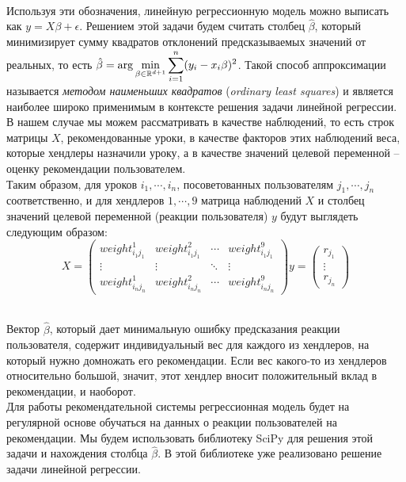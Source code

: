 \documentclass[14pt]{matmex-diploma}
\begin{document}
\\\indent Используя эти обозначения, линейную регрессионную модель можно выписать как $y = X \beta + \epsilon$. Решением этой задачи будем считать столбец $\hat\beta$, который минимизирует сумму квадратов отклонений предсказываемых значений от реальных, то есть $\displaystyle \hat\beta = {\rm arg}\min_{\beta\in\mathbb{R}^{d+1}} \sum_{i=1}^n (y_i - x_i \beta)^2$. Такой способ аппроксимации называется \textit{методом наименьших квадратов} (\textit{ordinary least squares}) и является наиболее широко применимым в контексте решения задачи линейной регрессии.
\\\indent В нашем случае мы можем рассматривать в качестве наблюдений, то есть строк матрицы $X$, рекомендованные уроки, в качестве факторов этих наблюдений веса, которые хендлеры назначили уроку, а в качестве значений целевой переменной -- оценку рекомендации пользователем.
\\\indent Таким образом, для уроков $i_1, \cdots, i_n$, посоветованных пользователям $j_1, \cdots, j_n$ соответственно, и для хендлеров $1, \cdots, 9$ матрица наблюдений $X$ и столбец значений целевой переменной (реакции пользователя) $y$ будут выглядеть следующим образом:
$$X =
  \begin{pmatrix} weight_{i_1 j_1}^1 & weight_{i_1 j_1}^2 & \cdots & weight_{i_1 j_1}^9 \\
                      \vdots & \vdots & \ddots & \vdots \\
                      weight_{i_n j_n}^1 & weight_{i_n j_n}^2 & \cdots & weight_{i_n j_n}^9 \end{pmatrix}
y = \left(\begin{array}{c}
      r_{j_1} \\
      \vdots \\
      r_{j_n}
    \end{array}
  \right)$$         
 
\\\indent Вектор $\hat\beta$, который дает минимальную ошибку предсказания реакции пользователя, содержит индивидуальный вес для каждого из хендлеров, на который нужно домножать его рекомендации. Если вес какого-то из хендлеров относительно большой, значит, этот хендлер вносит положительный вклад в рекомендации, и наоборот. 
\\\indent Для работы рекомендательной системы регрессионная модель будет на регулярной основе обучаться на данных о реакции пользователей на рекомендации. Мы будем использовать библиотеку SciPy\cite{scipy} для решения этой задачи и нахождения столбца $\hat\beta$. В этой библиотеке уже реализовано решение задачи линейной регрессии.
\end{document}
